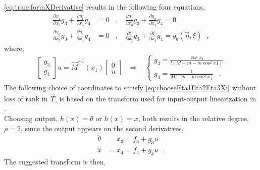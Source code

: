 \autoref{eq:transformXDerivative} results in the following four equations,
\begin{align}
    \frac{\partial \eta_1}{\partial x_3} g_3 + \frac{\partial \eta_1}{\partial x_4} g_4 &= 0                    \ \ \ \ ,\ \ \ \ %
    \frac{\partial \eta_2}{\partial x_3} g_3 + \frac{\partial \eta_2}{\partial x_4} g_4 = 0         \nonumber   \\ %
    \frac{\partial \eta_3}{\partial x_3} g_3 + \frac{\partial \eta_3}{\partial x_4} g_4 &= 0                    \ \ \ \ ,\ \ \ \ %
    \frac{\partial \xi   }{\partial x_3} g_3 + \frac{\partial \xi   }{\partial x_4} g_4 = g_b(\vec{\eta},\xi)  \label{eq:chooseEta1Eta2Eta3Xi} 
\ \ \ ,
\end{align}
where,
\begin{align}
  \begin{bmatrix}
    g_3  \\
    g_4
  \end{bmatrix} u = \vec{M}^{-1}(x_1) 
    \begin{bmatrix}
      0  \\
      u
    \end{bmatrix} \ \ \ \Rightarrow \ \ \ \ 
  \begin{cases}
    g_3 = \frac{\cos x_1}{l (M + m - m \cos^2 x1)}\\
    g_4 = \frac{1}{M + m - m \cos^2 x_1 } \ \ \ \ .
  \end{cases}
  \label{eq:g_3_and_4} 
\end{align}
%
The following choice of coordinates to satisfy \autoref{eq:chooseEta1Eta2Eta3Xi} without loss of rank in $\vec{T}$, is based on the transform used for input-output linearization in \cite{HKKhalil}.\\
Choosing output, $h(x) = \theta$ or $h(x) = x$, both results in the relative degree, $\rho = 2$, since the output appears on the second derivatives,
\begin{align}
  \ddot{\theta} &= \dot{x}_3 = f_3 + g_3 u
  \label{eq:thetaRelativeDeg} \\
  \ddot{x} &= \dot{x}_4 = f_4 + g_4 u \ \ \ .
  \label{eq:xRelativeDeg} 
\end{align}
The suggested transform is then,

